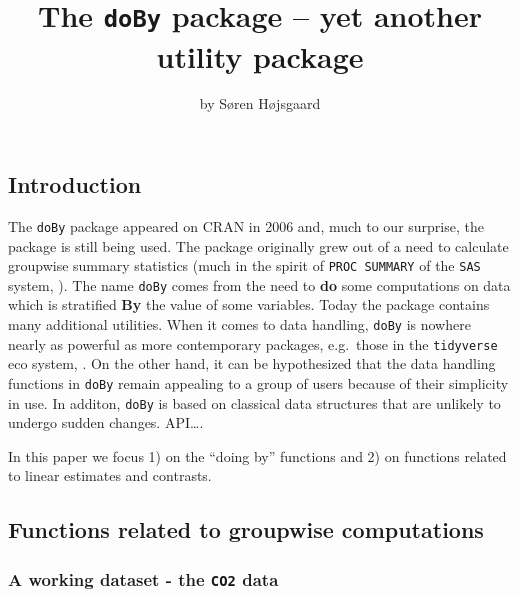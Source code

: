 \title{The \texttt{doBy} package -- yet another utility package}
\author{by Søren Højsgaard}

\maketitle


\hypertarget{introduction}{%
\subsection{Introduction}\label{introduction}}

The \texttt{doBy} package \citep{doby} appeared on CRAN in 2006 and,
much to our surprise, the package is still being used. The package
originally grew out of a need to calculate groupwise summary statistics
(much in the spirit of \texttt{PROC\ SUMMARY} of the \texttt{SAS}
system, \citep{procsummary}). The name \texttt{doBy} comes from the need
to \textbf{do} some computations on data which is stratified \textbf{By}
the value of some variables. Today the package contains many additional
utilities. When it comes to data handling, \texttt{doBy} is nowhere
nearly as powerful as more contemporary packages, e.g.~those in the
\texttt{tidyverse} eco system, \citep{tidyverse}. On the other hand, it
can be hypothesized that the data handling functions in \texttt{doBy}
remain appealing to a group of users because of their simplicity in use.
In additon, \texttt{doBy} is based on classical data structures that are
unlikely to undergo sudden changes. API\ldots.

In this paper we focus 1) on the ``doing by'' functions and 2) on
functions related to linear estimates and contrasts.

\hypertarget{functions-related-to-groupwise-computations}{%
\subsection{Functions related to groupwise
computations}\label{functions-related-to-groupwise-computations}}

\hypertarget{a-working-dataset---the-co2-data}{%
\subsubsection{\texorpdfstring{A working dataset - the \texttt{CO2}
data}{A working dataset - the CO2 data}}\label{a-working-dataset---the-co2-data}}

